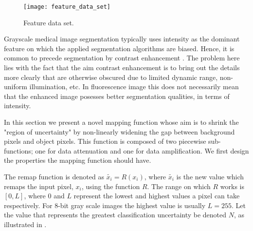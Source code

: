 \begin{figure}[!h]
	\centering
	\texttt{[image: feature\_data\_set]}
	\caption{Feature data set.}
	\label{fig:featuredataset}
\end{figure}

Grayscale medical image segmentation typically uses intensity as the dominant feature on which the applied segmentation algorithms are biased. Hence, it is common to precede segmentation by contrast enhancement \citep{Kim2003,Subr2005}. The problem here lies with the fact that the aim contrast enhancement is to bring out the details more clearly that are otherwise obscured due to limited dynamic range, non-uniform illumination, etc. In fluorescence image this does not necessarily mean that the enhanced image posesses better segmentation qualities, in terms of intensity.

In this section we present a novel mapping function whose aim is to shrink the "region of uncertainty" by non-linearly widening the gap between background pixels and object pixels. This function is composed of two piecewise sub-functions; one for data attenuation and one for data amplification. We first design the properties the mapping function should have. 

\begin{definition}
	The remap function is denoted as $\widetilde{x_i} = R(x_i)$, where $\widetilde{x_i}$ is the new value which remaps the input pixel, $x_i$, using the function $R$. The range on which $R$ works is $[0,L]$, where $0$ and $L$ represent the lowest and highest values a pixel can take respectively. For 8-bit gray scale images the highest value is usually $L=255$. Let the value that represents the greatest classification uncertainty be denoted $N$, as illustrated in .
\end{definition}

